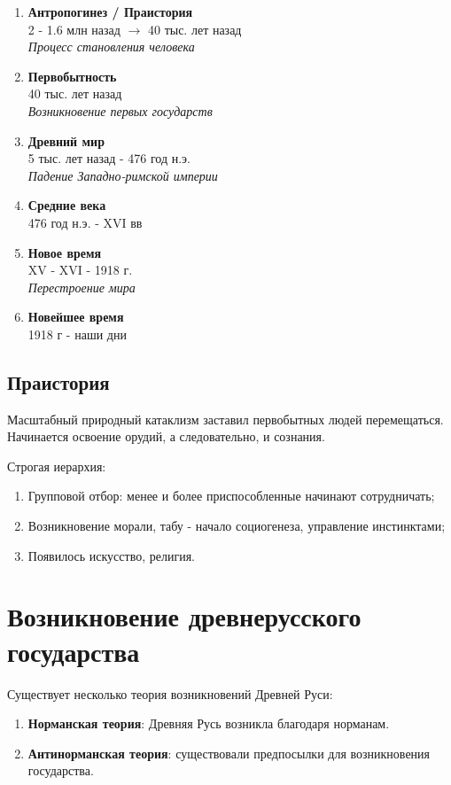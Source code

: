 \begin{enumerate}
  \item \textbf{Антропогинез / Праистория} \\
    2 - 1.6 млн назад $\to$ 40 тыс. лет назад \\
    \textit{Процесс становления человека}

  \item \textbf{Первобытность} \\
    40 тыс. лет назад \\
    \textit{Возникновение первых государств}

  \item \textbf{Древний мир} \\
    5 тыс. лет назад - 476 год н.э. \\
    \textit{Падение Западно-римской империи}

  \item \textbf{Средние века} \\
    476 год н.э. - XVI вв

  \item \textbf{Новое время} \\
    XV - XVI - 1918 г. \\
    \textit{Перестроение мира}

  \item \textbf{Новейшее время} \\
    1918 г - наши дни
\end{enumerate}

\subsection*{Праистория}

Масштабный природный катаклизм заставил первобытных людей перемещаться. Начинается освоение орудий, а следовательно, и сознания.

Строгая иерархия:
\begin{enumerate}
  \item Групповой отбор: менее и более приспособленные начинают сотрудничать;
  \item Возникновение морали, табу - начало социогенеза, управление инстинктами;
  \item Появилось искусство, религия.
\end{enumerate}

\section{Возникновение древнерусского государства}
Существует несколько теория возникновений Древней Руси:
\begin{enumerate}
  \item \textbf{Норманская теория}: Древняя Русь возникла благодаря норманам.
  \item \textbf{Антинорманская теория}: существовали предпосылки для возникновения государства.
\end{enumerate}

